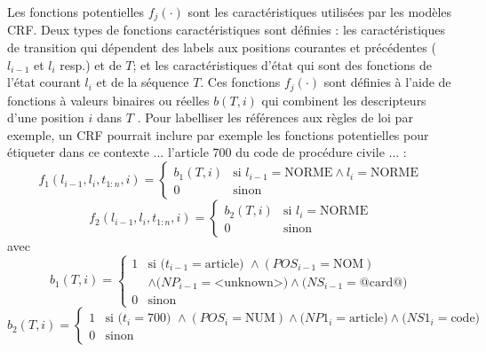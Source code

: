  Les fonctions potentielles $f_j(\cdot)$ sont les caractéristiques utilisées par les modèles CRF. Deux types de fonctions caractéristiques sont définies : les caractéristiques de transition qui dépendent des labels aux positions courantes et précédentes ($l_{i-1}$ et $ l_{i}$ resp.) et de $T$; et les caractéristiques d'état qui sont des fonctions de l'état courant $ l_{i} $ et de la séquence $ T $. Ces fonctions $f_j(\cdot)$ sont définies à l'aide de fonctions à valeurs binaires ou réelles $b(T,i)$ qui combinent les descripteurs d'une position $i$ dans $T$ \citep{Wallach2004crfintro}. Pour labelliser les références aux règles de loi par exemple, un CRF pourrait inclure par exemple les fonctions potentielles pour étiqueter   \fg{} dans ce contexte \og ... l'article 700 du code de procédure civile ... \fg{}:
{\small
\[f_1(l_{i-1},l_i,t_{1:n},i) = \left\lbrace \begin{array}{ll}
b_1(T,i) & \text{si } l_{i-1} = \text{NORME} \wedge l_i = \text{NORME} \\
0 & \text{sinon}
\end{array} \right.\]
\[f_2(l_{i-1},l_i,t_{1:n},i) = \left\lbrace \begin{array}{ll}
b_2(T,i) & \text{si }l_i = \text{NORME} \\
0 & \text{sinon}
\end{array} \right.\]
avec
\[b_1(T,i) = \left\lbrace \begin{array}{ll}
1 & \text{si } (t_{i-1} =\text{article) }\wedge (POS_{i-1}=\text{NOM}) \\&  \wedge  (NP_{i-1}=\text{<unknown>)} \wedge (NS_{i-1}=\text{@card@)} \\
0 & \text{sinon} 
\end{array} \right.\]
\[b_2(T,i) = \left\lbrace \begin{array}{ll}
1 & \text{si } (t_i =\text{700) }\wedge (POS_i=\text{NUM})  \wedge (NP1_i=\text{article)} 
\wedge (NS1_i=\text{code)} \\
0 & \text{sinon}
\end{array} \right.\]
}
